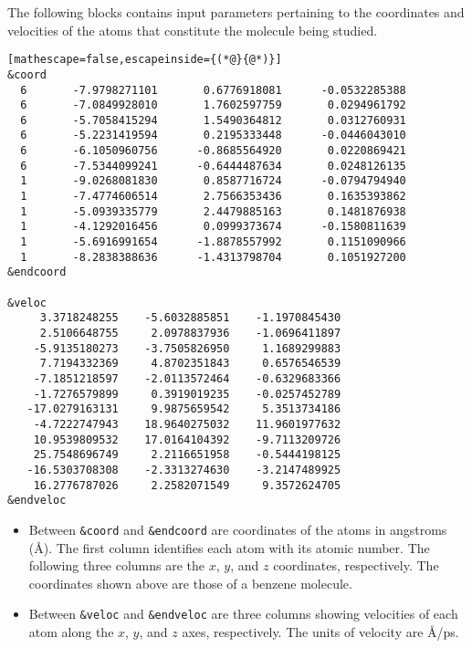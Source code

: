 The following blocks contains input parameters pertaining to the coordinates and velocities of the atoms that constitute the molecule being studied.
\begin{lstlisting}[mathescape=false,escapeinside={(*@}{@*)}]
&coord
  6       -7.9798271101       0.6776918081      -0.0532285388
  6       -7.0849928010       1.7602597759       0.0294961792
  6       -5.7058415294       1.5490364812       0.0312760931
  6       -5.2231419594       0.2195333448      -0.0446043010
  6       -6.1050960756      -0.8685564920       0.0220869421
  6       -7.5344099241      -0.6444487634       0.0248126135
  1       -9.0268081830       0.8587716724      -0.0794794940
  1       -7.4774606514       2.7566353436       0.1635393862
  1       -5.0939335779       2.4479885163       0.1481876938
  1       -4.1292016456       0.0999373674      -0.1580811639
  1       -5.6916991654      -1.8878557992       0.1151090966
  1       -8.2838388636      -1.4313798704       0.1051927200
&endcoord

&veloc
     3.3718248255    -5.6032885851    -1.1970845430
     2.5106648755     2.0978837936    -1.0696411897
    -5.9135180273    -3.7505826950     1.1689299883
     7.7194332369     4.8702351843     0.6576546539
    -7.1851218597    -2.0113572464    -0.6329683366
    -1.7276579899     0.3919019235    -0.0257452789
   -17.0279163131     9.9875659542     5.3513734186
    -4.7222747943    18.9640275032    11.9601977632
    10.9539809532    17.0164104392    -9.7113209726
    25.7548696749     2.2116651958    -0.5444198125
   -16.5303708308    -2.3313274630    -3.2147489925
    16.2776787026     2.2582071549     9.3572624705
&endveloc
\end{lstlisting}
\begin{itemize}
\item Between \verb+&coord+ and \verb+&endcoord+ are coordinates of the atoms in angstroms (\AA).  The first column identifies each atom with its atomic number.  The following three columns are the $x$, $y$, and $z$ coordinates, respectively.  The coordinates shown above are those of a benzene molecule.
\item Between \verb+&veloc+ and \verb+&endveloc+ are three columns showing velocities of each atom along the $x$, $y$, and $z$ axes, respectively.  The units of velocity are \AA/ps. 
\end{itemize}

